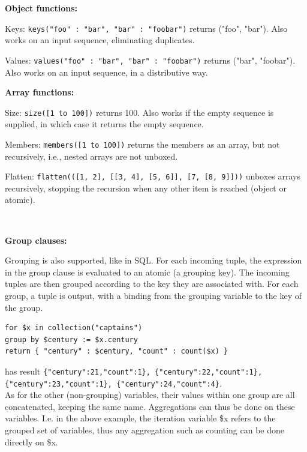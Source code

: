 \documentclass[11pt,oneside,a4paper]{article}
\begin{document}
{\textbf{Object functions:}

\begin{compactitem}
\item Keys: \texttt{keys({"foo" : "bar", "bar" : "foobar"})} returns ("foo", "bar"). Also works on an input sequence, eliminating duplicates.
\item Values: \texttt{values({"foo" : "bar", "bar" : "foobar"})} returns ("bar", "foobar"). Also works on an input sequence, in a distributive way.
\end{compactitem}

\textbf{Array functions:}

\begin{compactitem}
\item Size: \texttt{size([1 to 100])} returns 100. Also works if the empty sequence is supplied, in which case it returns the empty sequence.
\item Members: \texttt{members([1 to 100])} returns the members as an array, but not recursively, i.e., nested arrays are not unboxed.
\item Flatten: \texttt{flatten(([1, 2], [[3, 4], [5, 6]], [7, [8, 9]]))} unboxes arrays recursively, stopping the recursion when any other item is reached (object or atomic).
\end{compactitem}\

\textbf{Group clauses:}

Grouping is also supported, like in SQL. For each incoming tuple, the expression in the group clause is evaluated to an atomic (a grouping key). The incoming tuples are then grouped according to the key they are associated with. For each group, a tuple is output, with a binding from the grouping variable to the key of the group.

\begin{lstlisting}[basicstyle=\small]
for $x in collection("captains")
group by $century := $x.century
return { "century" : $century, "count" : count($x) }
\end{lstlisting}

has result \texttt{\{"century":21,"count":1\}, \{"century":22,"count":1\}, \{"century":23,"count":1\}, \{"century":24,"count":4\}}.\\

As for the other (non-grouping) variables, their values within one group are all concatenated, keeping the same name. Aggregations can thus be done on these variables. I.e. in the above example, the iteration variable \$x refers to the grouped set of variables, thus any aggregation such as counting can be done directly on \$x.

}
\end{document}
